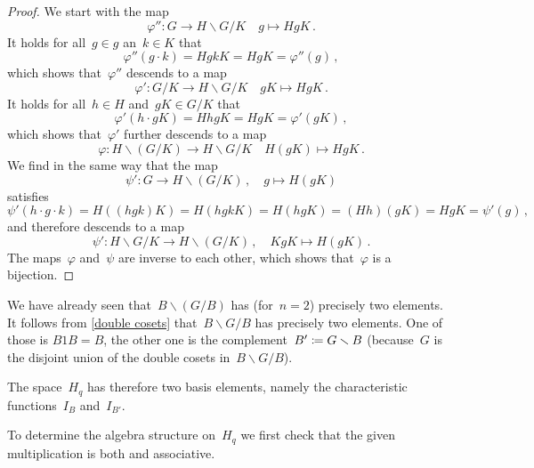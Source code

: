 \begin{proof}
  We start with the {\welldef} map
  \[
            \varphi''
    \colon  G
    \to     H \backslash G / K
    \quad   g
    \mapsto H g K \,.
  \]
  It holds for all~$g \in g$ an~$k \in K$ that
  \[
      \varphi''(g \cdot k)
    = H g k K
    = H g K
    = \varphi''(g) \,,
  \]
  which shows that~$\varphi''$ descends to a {\welldef} map
  \[
            \varphi'
    \colon  G / K
    \to     H \backslash G / K
    \quad   gK
    \mapsto H g K \,.
  \]
  It holds for all~$h \in H$ and~$gK \in G/K$ that
  \[
      \varphi'(h \cdot gK)
    = H hg K
    = H g K
    = \varphi'(gK) \,,
  \]
  which shows that~$\varphi'$ further descends to a {\welldef} map
  \[
            \varphi
    \colon  H \backslash (G / K)
    \to     H \backslash G / K
    \quad   H(gK)
    \mapsto H g K \,.
  \]
  We find in the same way that the {\welldef} map
  \[
            \psi'
    \colon  G
    \to     H \backslash (G / K) \,,
    \quad   g
    \mapsto H(gK)
  \]
  satisfies
  \[
      \psi'(h \cdot g \cdot k)
    = H((hgk)K)
    = H(hgkK)
    = H(hgK)
    = (Hh)(gK)
    = HgK
    = \psi'(g)  \,,
  \]
  and therefore descends to a {\welldef} map
  \[
            \psi'
    \colon  H \backslash G / K
    \to     H \backslash (G / K) \,,
    \quad   KgK
    \mapsto H(gK) \,.
  \]
  The maps~$\varphi$ and~$\psi$ are inverse to each other, which shows that~$\varphi$ is a bijection.
\end{proof}


We have already seen that~$B \backslash (G / B)$ has (for~$n = 2$) precisely two elements.
It follows from \cref{double cosets} that~$B \backslash G / B$ has precisely two elements.
One of those is $B 1 B = B$, the other one is the complement~$B' \coloneqq G \smallsetminus B$ (because~$G$ is the disjoint union of the double cosets in~$B \backslash G / B$).

The space~$H_q$ has therefore two basis elements, namely the characteristic functions~$I_B$ and~$I_{B'}$.

To determine the algebra structure on~$H_q$ we first check that the given multiplication is both {\welldef} and associative.

